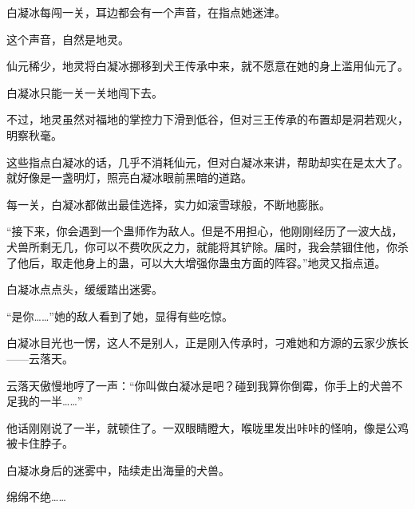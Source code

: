 \begin{this_body}
白凝冰每闯一关，耳边都会有一个声音，在指点她迷津。

这个声音，自然是地灵。

仙元稀少，地灵将白凝冰挪移到犬王传承中来，就不愿意在她的身上滥用仙元了。

白凝冰只能一关一关地闯下去。

不过，地灵虽然对福地的掌控力下滑到低谷，但对三王传承的布置却是洞若观火，明察秋毫。

这些指点白凝冰的话，几乎不消耗仙元，但对白凝冰来讲，帮助却实在是太大了。就好像是一盏明灯，照亮白凝冰眼前黑暗的道路。

每一关，白凝冰都做出最佳选择，实力如滚雪球般，不断地膨胀。

“接下来，你会遇到一个蛊师作为敌人。但是不用担心，他刚刚经历了一波大战，犬兽所剩无几，你可以不费吹灰之力，就能将其铲除。届时，我会禁锢住他，你杀了他后，取走他身上的蛊，可以大大增强你蛊虫方面的阵容。”地灵又指点道。

白凝冰点点头，缓缓踏出迷雾。

“是你……”她的敌人看到了她，显得有些吃惊。

白凝冰目光也一愣，这人不是别人，正是刚入传承时，刁难她和方源的云家少族长——云落天。

云落天傲慢地哼了一声：“你叫做白凝冰是吧？碰到我算你倒霉，你手上的犬兽不足我的一半……”

他话刚刚说了一半，就顿住了。一双眼睛瞪大，喉咙里发出咔咔的怪响，像是公鸡被卡住脖子。

白凝冰身后的迷雾中，陆续走出海量的犬兽。

绵绵不绝……

\end{this_body}

